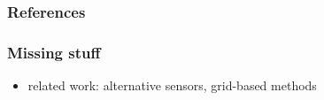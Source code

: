 \backupbegin

\begin{frame}[allowframebreaks]
  \frametitle{References}
  \nocite{*}
  
  
\end{frame}

\begin{frame}
  \frametitle{Missing stuff}
  \begin{itemize}
  \item related work: alternative sensors, grid-based methods
  \end{itemize}
\end{frame}

\backupend



